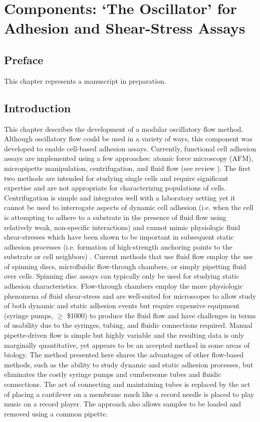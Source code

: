 \chapter{Components: `The Oscillator' for Adhesion and Shear-Stress Assays}
\label{Chap:Oscillator}

\section{Preface}
This chapter represents a manuscript in preparation. 

\section{Introduction}
This chapter describes the development of a modular oscillatory flow method. Although oscillatory flow could be used in a variety of ways, this component was developed to enable cell-based adhesion assays. Currently, functional cell adhesion assays are implemented using a few approaches: atomic force microscopy (AFM), micropipette manipulation, centrifugation, and fluid flow (see review \cite{Christ:2010ly}). The first two methods are intended for studying single cells and require significant expertise and are not appropriate for characterizing populations of cells. Centrifugation is simple and integrates well with a laboratory setting yet it cannot be used to interrogate aspects of dynamic cell adhesion (i.e. when the cell is attempting to adhere to a substrate in the presence of fluid flow using relatively weak, non-specific interactions) and cannot mimic physiologic fluid shear-stresses which have been shown to be important in subsequent static adhesion processes (i.e. formation of high-strength anchoring points to the substrate or cell neighbors) \cite{Sengbusch:2005zr}. Current methods that use fluid flow employ the use of spinning discs, microfluidic flow-through chambers, or simply pipetting fluid over cells. Spinning disc assays can typically only be used for studying static adhesion characteristics. Flow-through chambers employ the more physiologic phenomena of fluid shear-stress and are well-suited for microscopes to allow study of both dynamic and static adhesion events but require expensive equipment (syringe pumps, $\ge$ \$1000) to produce the fluid flow and have challenges in terms of usability due to the syringes, tubing, and fluidic connections required. Manual pipette-driven flow is simple but highly variable and the resulting data is only marginally quantitative, yet appears to be an accepted method in some areas of biology. The method presented here shares the advantages of other flow-based methods, such as the ability to study dynamic and static adhesion processes, but eliminates the costly syringe pumps and cumbersome tubes and fluidic connections. The act of connecting and maintaining tubes is replaced by the act of placing a cantilever on a membrane much like a record needle is placed to play music on a record player. The approach also allows samples to be loaded and removed using a common pipette. 

